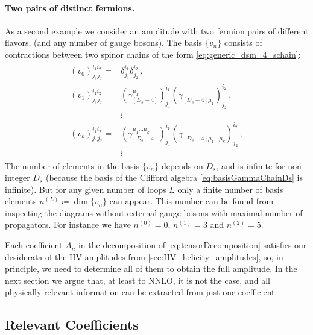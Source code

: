 \paragraph{Two pairs of distinct fermions.}
As a second example we consider an amplitude with two fermion pairs of different flavors, (and any number of gauge bosons). 
The basis $\{v_n\}$ consists of contractions between two spinor chains of the form \cref{eq:generic_dsm_4_schain}:
\begin{align}
  \begin{split} \label{eqn:4qtensors}
    (v_0)_{j_1j_2}^{i_1i_2}   = &
    \delta_{j_1}^{i_1} \delta_{j_2}^{i_2}\,, \\
    (v_1)_{j_1j_2}^{i_1i_2}=
    &(\gamma_{[D_s-4]}^{\mu_1} )_{j_1}^{i_1} 
    (\gamma_{[D_s-4]\mu_1}^{\phantom{\mu}})_{j_2}^{i_2}\,, \\
    & \vdots\\
    (v_k)_{j_1j_2}^{i_1i_2}=
    &(\gamma_{[D_s-4]}^{\mu_1 \ldots  \mu_k})_{j_1}^{i_1}
    (\gamma_{[D_s-4]\mu_1 \ldots \mu_k}^{\phantom{\mu}})_{j_2}^{i_2}\,,\\
    & \vdots\,
  \end{split}
\end{align}
The number of elements in the basis $\{v_n\}$ depends on $D_s$,
and is infinite for non-integer $D_s$ (because the basis of the Clifford algebra \cref{eq:basisGammaChainDs} is infinite).
But for any given number of loops $L$ only a finite number of basis elements $n^{(L)}\coloneqq \dim\{v_n\}$ can appear.
This number can be found from inspecting the diagrams without external gauge bosons 
with maximal number of propagators.
For instance we have $n^{(0)}=0$, $n^{(1)}=3$ and $n^{(2)}=5$.

Each coefficient $A_n$ in the decomposition of \cref{eq:tensorDecomposition} satisfies our desiderata 
of the HV amplitudes from \cref{sec:HV_helicity_amplitudes}, so, in principle, we need to determine all of them to obtain the full amplitude.
In the next section we argue that, at least to NNLO, it is not the case, 
and all physically-relevant information can be extracted from just one coefficient.  

\subsection{Relevant Coefficients}
\label{sec:relevant_tensors}

